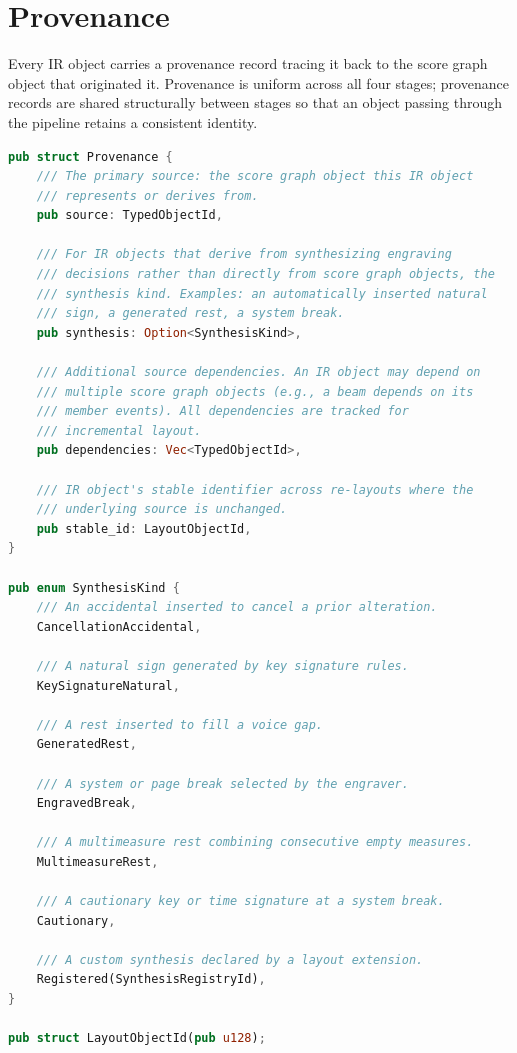 \documentclass[11pt,letterpaper]{report}
\begin{document}
\section{Provenance}
\label{sec:layoutir:provenance}

Every IR object carries a provenance record tracing it back to the
score graph object that originated it. Provenance is uniform across
all four stages; provenance records are shared structurally between
stages so that an object passing through the pipeline retains a
consistent identity.

\begin{lstlisting}[language=Rust]
pub struct Provenance {
    /// The primary source: the score graph object this IR object
    /// represents or derives from.
    pub source: TypedObjectId,

    /// For IR objects that derive from synthesizing engraving
    /// decisions rather than directly from score graph objects, the
    /// synthesis kind. Examples: an automatically inserted natural
    /// sign, a generated rest, a system break.
    pub synthesis: Option<SynthesisKind>,

    /// Additional source dependencies. An IR object may depend on
    /// multiple score graph objects (e.g., a beam depends on its
    /// member events). All dependencies are tracked for
    /// incremental layout.
    pub dependencies: Vec<TypedObjectId>,

    /// IR object's stable identifier across re-layouts where the
    /// underlying source is unchanged.
    pub stable_id: LayoutObjectId,
}

pub enum SynthesisKind {
    /// An accidental inserted to cancel a prior alteration.
    CancellationAccidental,

    /// A natural sign generated by key signature rules.
    KeySignatureNatural,

    /// A rest inserted to fill a voice gap.
    GeneratedRest,

    /// A system or page break selected by the engraver.
    EngravedBreak,

    /// A multimeasure rest combining consecutive empty measures.
    MultimeasureRest,

    /// A cautionary key or time signature at a system break.
    Cautionary,

    /// A custom synthesis declared by a layout extension.
    Registered(SynthesisRegistryId),
}

pub struct LayoutObjectId(pub u128);
\end{lstlisting}
\end{document}

